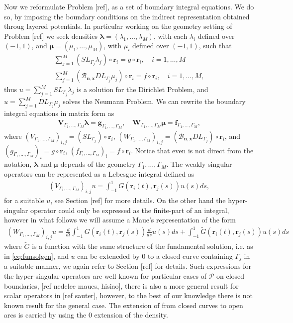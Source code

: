 \documentclass{article}
\newcommand{\todo}[1]{{\color{red}[#1]}}
\newcommand{\bmu} {\bm{\mu}}
\newcommand{\bg}{\bm{g}}
\newcommand{\bla}{\boldsymbol \lambda}
\newcommand{\bn}{\bm{n}}
\newcommand{\br}{\bm{r}}
\newcommand{\bx}{\bm{x}}
\begin{document}
Now we reformulate Problem \todo{ref}, as a set of boundary integral equations. We do so, by imposing the boundary conditions on the indirect representation obtained throug layered potentials. In particular working on the geometry setting of Problem \todo{ref} we seek densities $\bla = (\lambda_1,\hdots,\lambda_M)$, with each $\lambda_i$ defined over $(-1,1)$, and $\bmu = (\mu_1, \hdots, \mu_M)$, with $\mu_i$ defined over $(-1,1)$, such that
\begin{align*}
\sum_{j=1}^M (SL_{\Gamma_j} \lambda_j )\circ \br_i = g\circ \br_i, \quad i = 1,\hdots,M \\
\sum_{j=1}^M (\mathcal{B}_{\bn,\bx}DL_{\Gamma_j} \mu_j )\circ \br_i = f\circ \br_i, \quad i = 1,\hdots,M,
\end{align*}
 thus $u = \sum_{j=1}^M SL_{\Gamma_j} \lambda_j $ is a solution for the Dirichlet Problem, and  $u = \sum_{j=1}^M DL_{\Gamma_j} \mu_j $ solves the Neumann Problem. We can rewrite the boundary integral equations in matrix form as 
\begin{align}
\label{eq:bios}
\mathbf{V}_{\Gamma_1,\hdots,\Gamma_M} \bla = \bg_{\Gamma_1,\hdots,\Gamma_M}, \quad \mathbf{W}_{\Gamma_1,\hdots,\Gamma_M} \bmu = \mathbf{f}_{\Gamma_1,\hdots,\Gamma_M},
\end{align}
where $(V_{\Gamma_1,\hdots,\Gamma_M})_{i,j} = (SL_{\Gamma_j}  )\circ \br_i$, $(W_{\Gamma_1,\hdots,\Gamma_M})_{i,j} = (\mathcal{B}_{\bn,\bx}DL_{\Gamma_j} )\circ \br_i$, and $(g_{\Gamma_1,\hdots,\Gamma_M})_i = g \circ \br_i$, $(f_{\Gamma_1,\hdots,\Gamma_M})_i = f \circ \br_i$. Notice that even is not direct from the notation, $\bla$ and $\bmu$ depends of the geometry $\Gamma_1,\hdots,\Gamma_M$. The weakly-singular operators can be represented as a Lebesgue integral defined as 
\begin{align*}
(V_{\Gamma_1,\hdots,\Gamma_M})_{i,j}u = \int_{-1}^1G(\br_i(t),\br_j(s)) u(s) ds,
\end{align*}
for a suitable $u$, see Section \todo{ref} for more details. On the other hand the hyper-singular operator could only be expressed as the finite-part of an integral, however in what follows we will assume a Maue's representation of the form 
\begin{align*}
(W_{\Gamma_1,\hdots,\Gamma_M})_{i,j}u =  \frac{d}{dt}\int_{-1}^1G(\br_i(t),\br_j(s)) \frac{d}{ds}u(s) ds + 
\int_{-1}^1\widetilde{G}(\br_i(t),\br_j(s))u(s) ds
\end{align*} 
where $\widetilde{G}$ is a function with the same structure of the fundamental solution, i.e. as in \eqref{eq:funsolgen}, and $u$ can be exteneded by 0 to a closed curve containing $\Gamma_j$ in a suitable manner, we again refer to Section \todo{ref} for details. Such expressions for the hyper-singular operators are well known for particular cases of $\mathcal{P}$ on closed boundaries, \todo{ref nedelec maues, hisiao}, there is also a more general result for scalar operators in \todo{ref sauter}, however, to the best of our knowledge there is not known result for the general case. The extension of from closed curves to open arcs is carried by using the $0$ extension of the density. 
\end{document}
